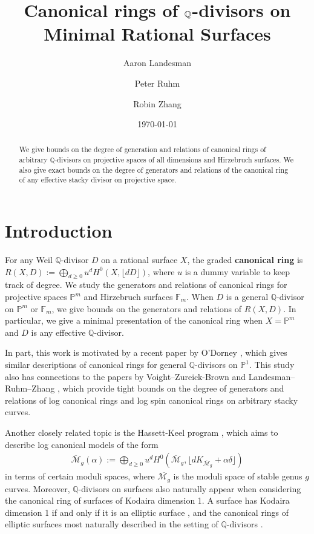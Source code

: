 \documentclass{amsart}
\title{Canonical rings of $\bq$-divisors on Minimal Rational Surfaces}
\author{Aaron Landesman}
\author{Peter Ruhm}
\author{Robin Zhang}
\date{\today}
\theoremstyle{plain}
\theoremstyle{definition}
\theoremstyle{remark}
\numberwithin{equation}{section}
\newcommand\bq{{\mathbb Q}}
\newcommand\bp{{\mathbb P}}
\newcommand\hirz{\mathbb{F}}
\begin{document}
\begin{abstract}
 	We give bounds on the degree of generation and relations of
	canonical rings of arbitrary $\bq$-divisors on projective spaces of 
	all dimensions and Hirzebruch surfaces. We also give exact bounds 
	on the degree of generators and relations of the canonical ring of 
	any effective stacky divisor on projective space.
\end{abstract}

\maketitle

\section{Introduction}
\label{sec:intro}
For any Weil $\bq$-divisor $D$ on a rational surface $X$, the graded
\textbf{canonical ring} is $R(X, D) := \bigoplus_{d \geq 0} u^d
H^0(X, \lfloor dD \rfloor)$, where $u$ is a dummy variable to keep
track of degree.
We study the generators and relations of canonical
rings for projective spaces $\bp^m$ and Hirzebruch surfaces $\hirz_m$.
When $D$ is a general $\bq$-divisor on $\bp^m$ or
$\hirz_m$, we give bounds on the generators and relations of
$R(X, D)$. In particular, we give a minimal presentation of the
canonical ring when $X = \bp^m$ and $D$ is any effective
$\bq$-divisor.  

In part, this work is motivated by a recent paper by
O'Dorney \cite{dorney:canonical}, which gives similar descriptions
of canonical rings for general $\bq$-divisors on $\bp^1$. This
study also has connections to the papers by Voight--Zureick-Brown 
\cite{vzb:stacky} and Landesman--Ruhm--Zhang \cite{lrz:spin-cring},
which provide tight bounds on the degree of generators and relations
of log canonical rings and log spin canonical rings on arbitrary
stacky curves.

Another closely related topic is the Hassett-Keel program \cite{hassett:classical-and-minimal-models}, which aims to describe log canonical models of the form 
\begin{align*}
	\overline {\mathscr M}_g(\alpha) := \bigoplus_{d \geq 0} u^d H^0 \left(
	\overline {\mathscr M}_g, \lfloor d K_{\overline{\mathscr M}_g} +
	\alpha\delta \rfloor  \right) 
\end{align*}
in terms of certain moduli spaces, where $\overline {\mathscr M_g}$ is the
moduli space of stable genus $g$ curves.
Moreover, $\bq$-divisors on surfaces also naturally
appear when considering the canonical ring of surfaces of Kodaira dimension 1.
A surface has Kodaira dimension 1 if and only if it is an elliptic surface \cite[p. 244]{
barthHPV:compactComplexSurfaces}, and
the canonical rings of elliptic surfaces most naturally described in the setting of
$\bq$-divisors \cite[Chapter V, Theorem 12.1]{barthHPV:compactComplexSurfaces}. 
\end{document}
